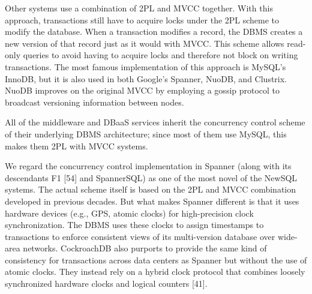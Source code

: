 \documentclass[a4paper,12pt,notitlepage,twoside,openright]{article}
\begin{document}
Other systems use a combination of 2PL and MVCC together. With this
approach, transactions still have to acquire locks under the 2PL scheme
to modify the database. When a transaction modifies a record, the DBMS
creates a new version of that record just as it would with MVCC. This
scheme allows read-only queries to avoid having to acquire locks and
therefore not block on writing transactions. The most famous
implementation of this approach is MySQL's InnoDB, but it is also used
in both Google's Spanner, NuoDB, and Clustrix. NuoDB improves on the
original MVCC by employing a gossip protocol to broadcast versioning
information between nodes.

All of the middleware and DBaaS services inherit the concurrency control
scheme of their underlying DBMS architecture; since most of them use
MySQL, this makes them 2PL with MVCC systems.

We regard the concurrency control implementation in Spanner (along with
its descendants F1 {[}54{]} and SpannerSQL) as one of the most novel of
the NewSQL systems. The actual scheme itself is based on the 2PL and
MVCC combination developed in previous decades. But what makes Spanner
different is that it uses hardware devices (e.g., GPS, atomic clocks)
for high-precision clock synchronization. The DBMS uses these clocks to
assign timestamps to transactions to enforce consistent views of its
multi-version database over wide-area networks. CockroachDB also
purports to provide the same kind of consistency for transactions across
data centers as Spanner but without the use of atomic clocks. They
instead rely on a hybrid clock protocol that combines loosely
synchronized hardware clocks and logical counters {[}41{]}.
\end{document}
